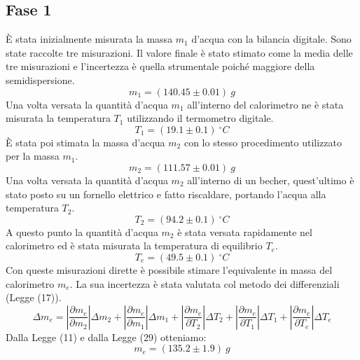 \subsection{Fase 1}
È stata inizialmente misurata la massa $m_1$ d'acqua con la bilancia digitale. Sono state raccolte tre misurazioni. Il valore finale è stato stimato come la media delle tre misurazioni e l'incertezza è quella strumentale poiché maggiore della semidispersione.
\begin{equation}
	m_1=(140.45\pm 0.01)\ g
\end{equation}
Una volta versata la quantità d'acqua $m_1$ all'interno del calorimetro ne è stata misurata la temperatura $T_1$ utilizzando il termometro digitale.
\begin{equation}
	T_1=(19.1\pm 0.1)\ ^{\circ}C
\end{equation}
È stata poi stimata la massa d'acqua $m_2$ con lo stesso procedimento utilizzato per la massa $m_1$.
\begin{equation}
	m_2=(111.57\pm 0.01)\ g
\end{equation}
Una volta versata la quantità d'acqua $m_2$ all'interno di un becher, quest'ultimo è stato posto su un fornello elettrico e fatto riscaldare, portando l'acqua alla temperatura $T_2$.
\begin{equation}
	T_2=(94.2\pm 0.1)\ ^{\circ}C
\end{equation}
A questo punto la quantità d'acqua $m_2$ è stata versata rapidamente nel calorimetro ed è stata misurata la temperatura di equilibrio $T_e$.
\begin{equation}
	T_e=(49.5\pm 0.1)\ ^{\circ}C
\end{equation}
Con queste misurazioni dirette è possibile stimare l'equivalente in massa del calorimetro $m_e$. La sua incertezza è stata valutata col metodo dei differenziali (Legge (17)).
\begin{equation}
	\Delta m_e=\left|\frac{\partial m_e}{\partial m_2} \right|\Delta m_2+\left|\frac{\partial m_e}{\partial m_1} \right|\Delta m_1 + \left|\frac{\partial m_e}{\partial T_2} \right|\Delta T_2 + \left|\frac{\partial m_e}{\partial T_1} \right|\Delta T_1 + \left|\frac{\partial m_e}{\partial T_e} \right|\Delta T_e
\end{equation}
Dalla Legge (11) e dalla Legge (29) otteniamo:
\begin{equation}
	m_e=(135.2\pm 1.9)\ g
\end{equation}



